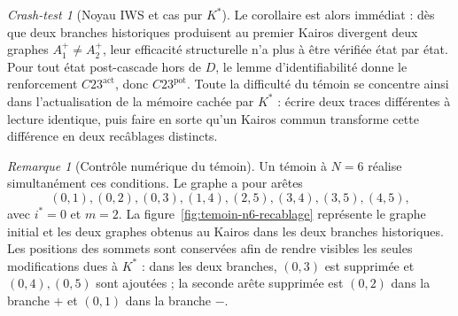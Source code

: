 \documentclass[11pt,a4paper]{article}
\theoremstyle{definition}
\theoremstyle{remark}
\newtheorem{remark}[definition]{Remarque}
\newtheorem{crashtest}[definition]{Crash-test}
\begin{document}
\begin{crashtest}[Noyau IWS et cas pur $K^*$]
Le corollaire est alors immédiat : dès que deux branches historiques produisent au premier Kairos divergent deux graphes $A_1^+\neq A_2^+$, leur efficacité structurelle n'a plus à être vérifiée état par état. Pour tout état post-cascade hors de $D$, le lemme d'identifiabilité donne le renforcement $C23^{\mathrm{act}}$, donc $C23^{\mathrm{pot}}$. Toute la difficulté du témoin se concentre ainsi dans l'actualisation de la mémoire cachée par $K^*$ : écrire deux traces différentes à lecture identique, puis faire en sorte qu'un Kairos commun transforme cette différence en deux recâblages distincts.

\begin{remark}[Contrôle numérique du témoin]
Un témoin à $N=6$ réalise simultanément ces conditions. Le graphe a pour arêtes
\[
(0,1),(0,2),(0,3),(1,4),(2,5),(3,4),(3,5),(4,5),
\]
avec $i^*=0$ et $m=2$. La figure~\ref{fig:temoin-n6-recablage} représente le graphe initial et les deux graphes obtenus au Kairos dans les deux branches historiques. Les positions des sommets sont conservées afin de rendre visibles les seules modifications dues à $K^*$ : dans les deux branches, $(0,3)$ est supprimée et $(0,4),(0,5)$ sont ajoutées ; la seconde arête supprimée est $(0,2)$ dans la branche $+$ et $(0,1)$ dans la branche $-$.

\begin{figure}[ht]
\centering
{}
\end{figure}
\end{remark}
\end{crashtest}
\end{document}
